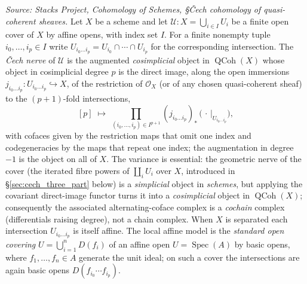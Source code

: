 \begin{definition}

  \label{def:cech_nerve}
  \textit{Source: Stacks Project, Cohomology of Schemes, \S{\v C}ech cohomology of
  quasi-coherent sheaves.}
  Let \(X\) be a scheme and let
  \(\mathcal{U} : X = \bigcup_{i \in I} U_i\) be a finite open cover of \(X\) by
  affine opens, with index set \(I\). For a finite nonempty tuple
  \(i_0, \ldots, i_p \in I\) write
  \(U_{i_0 \ldots i_p} = U_{i_0} \cap \cdots \cap U_{i_p}\) for the corresponding
  intersection. The \emph{{\v C}ech nerve} of \(\mathcal{U}\) is the augmented
  \emph{cosimplicial} object in \(\operatorname{QCoh}(X)\) whose object in
  cosimplicial degree \(p\) is the direct image, along the open immersions
  \(j_{i_0 \ldots i_p} : U_{i_0 \ldots i_p} \hookrightarrow X\), of the restriction
  of \(\mathcal{O}_X\) (or of any chosen quasi-coherent sheaf) to the
  \((p+1)\)-fold intersections,
  \[
    [p] \;\longmapsto\;
      \prod_{(i_0, \ldots, i_p) \in I^{p+1}}
        (j_{i_0 \ldots i_p})_* \,\bigl(\,\cdot\,|_{U_{i_0 \ldots i_p}}\bigr),
  \]
  with cofaces given by the restriction maps that omit one index and
  codegeneracies by the maps that repeat one index; the augmentation in degree
  \(-1\) is the object on all of \(X\). The variance is essential: the geometric
  nerve of the cover (the iterated fibre powers of \(\coprod_i U_i\) over \(X\),
  introduced in \S\ref{sec:cech_three_part} below) is a \emph{simplicial} object
  in \emph{schemes}, but applying the covariant direct-image functor turns it into
  a \emph{cosimplicial} object in \(\operatorname{QCoh}(X)\); consequently the
  associated alternating-coface complex is a \emph{cochain} complex (differentials
  raising degree), not a chain complex. When \(X\) is separated each intersection
  \(U_{i_0 \ldots i_p}\) is itself affine. The local affine model is the
  \emph{standard open covering} \(U = \bigcup_{i=1}^n D(f_i)\) of an affine open
  \(U = \operatorname{Spec}(A)\) by basic opens, where \(f_1, \ldots, f_n \in A\)
  generate the unit ideal; on such a cover the intersections are again basic opens
  \(D(f_{i_0} \cdots f_{i_p})\).
\end{definition}

